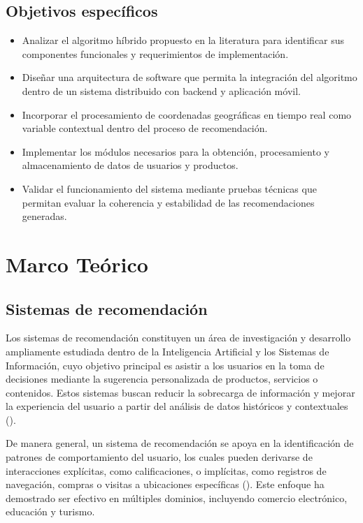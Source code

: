\documentclass[11pt, letterpaper]{article}
\begin{document}
	\subsection{Objetivos específicos}
	
	\begin{itemize}
		\item Analizar el algoritmo híbrido propuesto en la literatura para identificar sus componentes funcionales y requerimientos de implementación.
		
		\item Diseñar una arquitectura de software que permita la integración del algoritmo dentro de un sistema distribuido con backend y aplicación móvil.
		
		\item Incorporar el procesamiento de coordenadas geográficas en tiempo real como variable contextual dentro del proceso de recomendación.
		
		\item Implementar los módulos necesarios para la obtención, procesamiento y almacenamiento de datos de usuarios y productos.
		
		\item Validar el funcionamiento del sistema mediante pruebas técnicas que permitan evaluar la coherencia y estabilidad de las recomendaciones generadas.
	\end{itemize}
	
	
	\section{Marco Teórico}
	
	\subsection{Sistemas de recomendación}
	Los sistemas de recomendación constituyen un área de investigación y desarrollo ampliamente estudiada dentro de la Inteligencia Artificial y los Sistemas de Información, cuyo objetivo principal es asistir a los usuarios en la toma de decisiones mediante la sugerencia personalizada de productos, servicios o contenidos. Estos sistemas buscan reducir la sobrecarga de información y mejorar la experiencia del usuario a partir del análisis de datos históricos y contextuales (\cite{revision_sr_turismo}).
	
	De manera general, un sistema de recomendación se apoya en la identificación de patrones de comportamiento del usuario, los cuales pueden derivarse de interacciones explícitas, como calificaciones, o implícitas, como registros de navegación, compras o visitas a ubicaciones específicas (\cite{rodas_sr_colaborativo}). Este enfoque ha demostrado ser efectivo en múltiples dominios, incluyendo comercio electrónico, educación y turismo.
	
\end{document}
